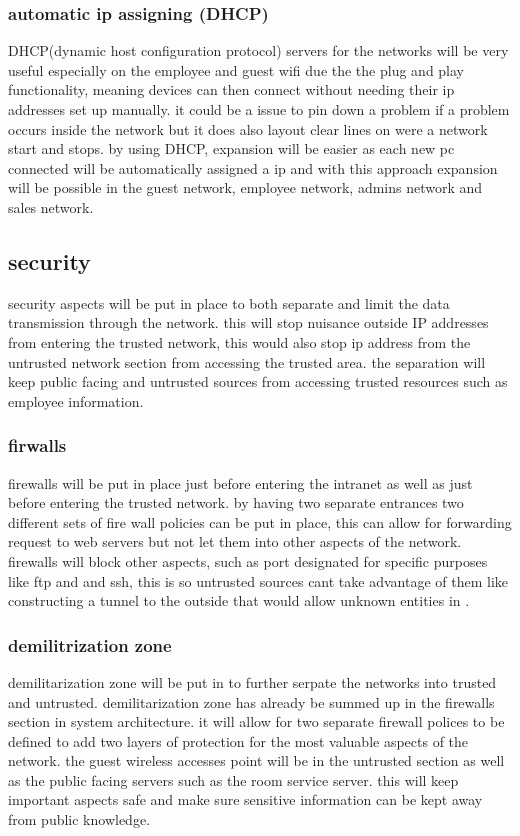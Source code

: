 \documentclass[11pt]{article}
\begin{document}
\subsubsection{automatic ip assigning (DHCP)}
DHCP(dynamic host configuration protocol) servers for the networks will be very useful especially on the employee and guest wifi due the the plug and play functionality, meaning devices can then connect without needing their ip addresses set up manually. it could be a issue to pin down a problem if a problem occurs inside the network but it does also layout clear lines on were a network start and stops. by using DHCP, expansion will be easier as each new pc connected will be automatically assigned a ip and with this approach expansion will be possible in the guest network, employee network, admins network and sales network\cite{droms1999automated}.

\subsection{security}
security aspects will be put in place to both separate and limit the data transmission through the network. this will stop nuisance outside IP addresses from entering the trusted network, this would also stop ip address from the untrusted network section from accessing the trusted area. the separation will keep public facing and untrusted sources from accessing trusted resources such as employee information.

\subsubsection{firwalls}
firewalls will be put in place just before entering the intranet as well as just before entering the trusted network. by having two separate entrances two different sets of fire wall policies can be put in place, this can allow for forwarding request to web servers but not let them into other aspects of the network. firewalls will block other aspects, such as port designated for specific purposes like ftp and and ssh, this is so untrusted sources cant take advantage of them like constructing a tunnel to the outside that would allow unknown entities in \cite{ioannidis2000implementing}.

\subsubsection{demilitrization zone}
demilitarization zone will be put in to further serpate the networks into trusted and untrusted. demilitarization zone has already be summed up in the firewalls section in system architecture. it will allow for two separate firewall polices to be defined to add two layers of protection for the most valuable aspects of the network. the guest wireless accesses point will be in the untrusted section as well as the public facing servers such as the room service server. this will keep important aspects safe and make sure sensitive information can be kept away from public knowledge\cite{webb2014network}.
\end{document}
